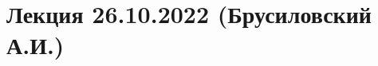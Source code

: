\documentclass[main.tex]{subfiles}
\begin{document}
\section{Лекция 26.10.2022 (Брусиловский А.И.)}
\end{document}
